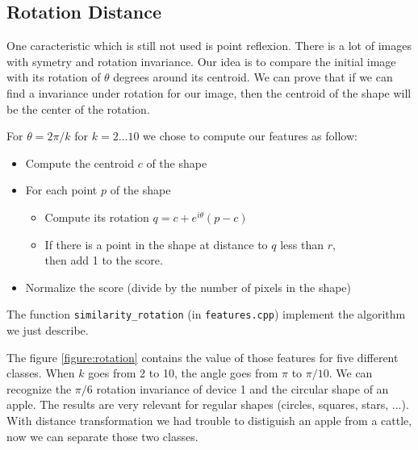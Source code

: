 \documentclass[a4paper, 11pt]{article}
\begin{document}
\subsection{Rotation Distance}

One caracteristic which is still not used is point reflexion. There is a lot of images with symetry and rotation invariance. Our idea is to compare the initial image with its rotation of $\theta$ degrees around its centroid. We can prove that if we can find a invariance under rotation for our image, then the centroid of the shape will be the center of the rotation.

\medskip \noindent For $\theta = 2 \pi / k$ for $k = 2 \dots 10$ we chose to compute our features as follow:
\begin{itemize}
  \item Compute the centroid $c$ of the shape
	\item For each point $p$ of the shape
	\begin{itemize}
	\item Compute its rotation $q = c + e^{i\theta}(p - c)$
	\item If there is a point in the shape at distance to $q$ less than $r$,\\then add 1 to the score.
  \end{itemize}
  \item Normalize the score (divide by the number of pixels in the shape)
\end{itemize}

\noindent The function \verb|similarity_rotation| (in \verb|features.cpp|) implement the algorithm we just describe.

\medskip\noindent The figure \ref{figure:rotation} contains the value of those features for five different classes. When $k$ goes from 2 to 10, the angle goes from $\pi$ to $\pi / 10$.
We can recognize the $\pi/6$ rotation invariance of device 1 and the circular shape of an apple.
The results are very relevant for regular shapes (circles, squares, stars, ...). With distance transformation we had trouble to distiguish an apple from a cattle, now we can separate those two classes.
\end{document}
